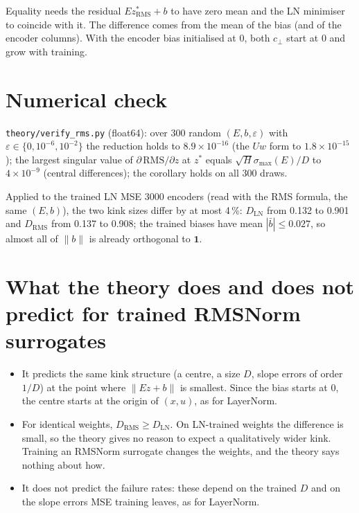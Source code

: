 \documentclass[11pt]{article}
\begin{document}
Equality needs the residual $E z^\ast_{\mathrm{RMS}} + b$ to have zero mean and the LN minimiser to coincide with it. The
difference comes from the mean of the bias (and of the encoder columns). With the encoder bias initialised at 0, both $c_\perp$
start at 0 and grow with training.

\section{Numerical check}
\texttt{theory/verify\_rms.py} (float64): over 300 random $(E, b, \varepsilon)$ with $\varepsilon \in \{0, 10^{-6}, 10^{-2}\}$ the
reduction holds to $8.9 \times 10^{-16}$ (the $U w$ form to $1.8 \times 10^{-15}$); the largest singular value of
$\partial\,\mathrm{RMS}/\partial z$ at $z^\ast$ equals $\sqrt{H}\sigma_{\max}(E)/D$ to $4 \times 10^{-9}$ (central differences);
the corollary holds on all 300 draws.

Applied to the trained LN MSE 3000 encoders (read with the RMS formula, the same $(E, b)$), the two kink sizes differ by at
most 4\,\%: $D_{\mathrm{LN}}$ from 0.132 to 0.901 and $D_{\mathrm{RMS}}$ from 0.137 to 0.908; the trained biases have mean
$|{\bar b}| \le 0.027$, so almost all of $\|b\|$ is already orthogonal to $\mathbf{1}$.

\section{What the theory does and does not predict for trained RMSNorm surrogates}
\begin{itemize}
\item It predicts the same kink structure (a centre, a size $D$, slope errors of order $1/D$) at the point where
  $\|E z + b\|$ is smallest. Since the bias starts at 0, the centre starts at the origin of $(x, u)$, as for LayerNorm.
\item For identical weights, $D_{\mathrm{RMS}} \ge D_{\mathrm{LN}}$. On LN-trained weights the difference is small, so the theory gives
  no reason to expect a qualitatively wider kink. Training an RMSNorm surrogate changes the weights, and the theory says
  nothing about how.
\item It does not predict the failure rates: these depend on the trained $D$ and on the slope errors MSE training leaves,
  as for LayerNorm.
\end{itemize}
\end{document}
